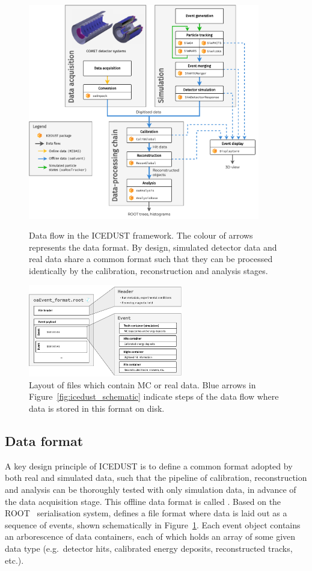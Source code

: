 \begin{figure}
    \centering
    \includegraphics[width=0.9\textwidth]{chapter3/ICEDUST_vertical.drawio.pdf}
    \caption{Data flow in the ICEDUST framework. The colour of arrows represents
        the data format. By design, simulated detector data and real data share
        a common format such that they can be processed identically by the
        calibration, reconstruction and analysis stages.}
    \label{fig:icedust_schematic}
    \vspace{1.2cm}
    \includegraphics[width=0.6\textwidth]{chapter3/oaEvent.drawio.pdf}
    \caption{Layout of \oaEvent files which contain MC or real data. Blue arrows
    in Figure~\ref{fig:icedust_schematic} indicate steps of the data flow where
    data is stored in this format on disk.}
    \label{fig:oaEvent}
\end{figure}

\subsection{Data format}
A key design principle of ICEDUST is to define a common format adopted by both
real and simulated data, such that the pipeline of calibration, reconstruction
and analysis can be thoroughly tested with only simulation data, in advance of
the data acquisition stage. This offline data format is called \oaEvent. Based
on the ROOT~\cite{BRUN199781} serialisation system, \oaEvent defines a file
format where data is laid out as a sequence of events, shown schematically in
Figure~\ref{fig:oaEvent}. Each event object contains an arborescence of data
containers, each of which holds an array of some given data type (e.g.\ detector
hits, calibrated energy deposits, reconstructed tracks, etc.).

